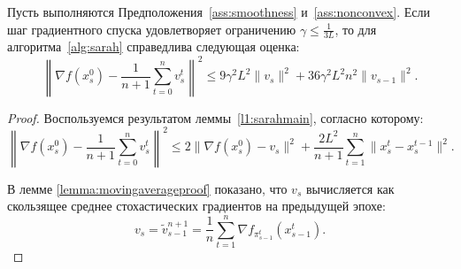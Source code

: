 \begin{lemma}\label{lemma6}
Пусть выполняются Предположения~\ref{ass:smoothness} и~\ref{ass:nonconvex}. Если шаг градиентного спуска удовлетворяет ограничению $\gamma \leqslant \frac{1}{3L}$, то для алгоритма~\ref{alg:sarah} справедлива следующая оценка:
\[
\left\| \nabla f(x_s^0) - \frac{1}{n+1}\sum\limits_{t=0}^n v_s^t\right\|^2 \leqslant 9\gamma^2L^2\|v_{s}\|^2 + 36\gamma^2L^2n^2\|v_{s-1}\|^2.
\]

\begin{proof}
Воспользуемся результатом леммы~\ref{l1:sarahmain}, согласно которому:
\begin{equation}\label{l6:ineq1}
    \left\| \nabla f(x_s^0) - \frac{1}{n+1} \sum\limits_{t=0}^n v_s^t\right\|^2 \leqslant 2\|\nabla f(x_s^0) - v_s \|^2 + \frac{2L^2}{n+1}\sum\limits_{t=1}^n \|x_s^t - x_s^{t-1}\|^2.
\end{equation}

В лемме \ref{lemma:movingaverageproof} показано, что \(v_s\) вычисляется как скользящее среднее стохастических градиентов на предыдущей эпохе:
\begin{equation}\label{l6:ineq2}
    v_s = \widetilde{v}_{s-1}^{n+1} = \frac{1}{n}\sum\limits_{t=1}^n \nabla f_{\pi_{s-1}^t}(x_{s-1}^t).
\end{equation}


\end{proof}
\end{lemma}
